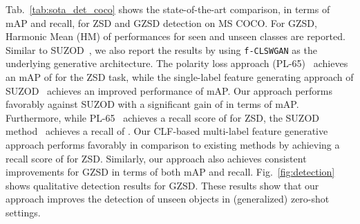 \documentclass[10pt,journal,compsoc]{IEEEtran}
\newcommand{\clswgan}{\texttt{f-CLSWGAN}}
\begin{document}
Tab.~\ref{tab:sota_det_coco} shows the state-of-the-art comparison, in terms of mAP and recall, for ZSD and GZSD detection on MS COCO. For GZSD, Harmonic Mean (HM) of performances for seen and unseen classes are reported. Similar to SUZOD~\cite{hayat2020synthesizing}, we also report the results by using \clswgan{} as the underlying generative architecture. The polarity loss approach (PL-65)~\cite{rahman2018polarity} achieves an mAP of  for the ZSD task, while the single-label feature generating approach of SUZOD~\cite{hayat2020synthesizing} achieves an improved performance of  mAP. Our approach performs favorably against SUZOD with a significant gain of  in terms of mAP.
Furthermore, while PL-65~\cite{rahman2018polarity} achieves a recall score of  for ZSD, the SUZOD method~\cite{hayat2020synthesizing}
achieves a recall of . Our CLF-based multi-label feature generative approach performs favorably in comparison to existing methods by achieving a recall score of  for ZSD. Similarly, our approach also achieves consistent improvements for GZSD in terms of both mAP and recall. Fig.~\ref{fig:detection} shows qualitative detection results for GZSD. These results show that our approach improves the detection of unseen objects in (generalized) zero-shot settings.
\end{document}
